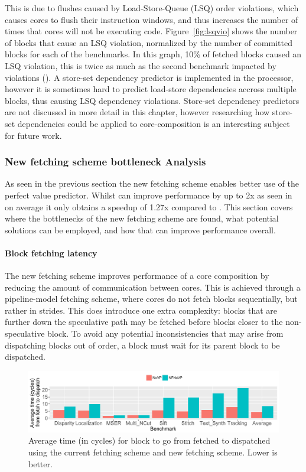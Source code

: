 This is due to flushes caused by Load-Store-Queue (LSQ) order violations, which causes cores to flush their instruction windows, and thus increases the number of times that cores will not be executing code.
Figure~\ref{fig:lsqvio} shows the number of blocks that cause an LSQ violation, normalized by the number of committed blocks for each of the benchmarks.
In this graph, 10\% of fetched blocks caused an LSQ violation, this is twice as much as the second benchmark impacted by violations ().
A store-set dependency predictor is implemented in the processor, however it is sometimes hard to predict load-store dependencies accross multiple blocks, thus causing LSQ dependency violations.
Store-set dependency predictors are not discussed in more detail in this chapter, however researching how store-set dependencies could be applied to core-composition is an interesting subject for future work.

\subsubsection{New fetching scheme bottleneck Analysis}

As seen in the previous section the new fetching scheme enables better use of the perfect value predictor. 
Whilst \nfnovp{} can improve performance by up to 2x as seen in  on average it only obtains a speedup of 1.27x compared to \novp{}.
This section covers where the bottlenecks of the new fetching scheme are found, what potential solutions can be employed, and how that can improve performance overall.

\paragraph*{Block fetching latency}

The new fetching scheme improves performance of a core composition by reducing the amount of communication between cores.
This is achieved through a pipeline-model fetching scheme, where cores do not fetch blocks sequentially, but rather in strides.
This does introduce one extra complexity: blocks that are further down the speculative path may be fetched before blocks closer to the non-speculative block.
To avoid any potential inconsistencies that may arise from dispatching blocks out of order, a block must wait for its parent block to be dispatched.

\begin{figure}[t]
    \centering
    \includegraphics[width=1\textwidth]{chapter3/graphics/avTime.pdf}
    \caption{Average time (in cycles) for block to go from fetched to dispatched using the current fetching scheme and new fetching scheme. Lower is better.}
    \label{fig:av_time}
	\vspace{1em}
\end{figure}

